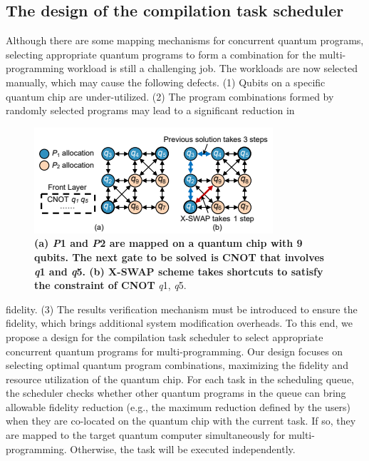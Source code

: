 \documentclass{article}
\begin{document}
			\subsection{The design of the compilation task scheduler}
				Although there are some mapping mechanisms for concurrent quantum programs, selecting appropriate quantum programs to form
				a combination for the multi-programming workload is still a challenging job. The workloads are now selected manually, which may
				cause the following defects. (1) Qubits on a specific quantum chip
				are under-utilized. (2) The program combinations formed by randomly selected programs may lead to a significant reduction in
				
				
				\begin{figure}[h]
					\centering
					\includegraphics[width=0.7\linewidth]{fig2}
					\caption{ \textbf{(a) \textit{P}1 and \textit{P}2 are mapped on a quantum chip with
						9 qubits. The next gate to be solved is CNOT that involves
						\textit{q}1 and \textit{q}5. (b) X-SWAP scheme takes shortcuts to satisfy the
						constraint of CNOT }\textit{q}1, \textit{q}5.}
					\label{fig:fig2}
				\end{figure}
				
				fidelity. (3) The results verification mechanism must be introduced
				to ensure the fidelity, which brings additional system modification
				overheads. To this end, we propose a design for the compilation task
				scheduler to select appropriate concurrent quantum programs for
				multi-programming. Our design focuses on selecting optimal quantum program combinations, maximizing the fidelity and resource
				utilization of the quantum chip. For each task in the scheduling
				queue, the scheduler checks whether other quantum programs in
				the queue can bring allowable fidelity reduction (e.g., the maximum
				reduction defined by the users) when they are co-located on the
				quantum chip with the current task. If so, they are mapped to the
				target quantum computer simultaneously for multi-programming.
				Otherwise, the task will be executed independently.
				
\end{document}
